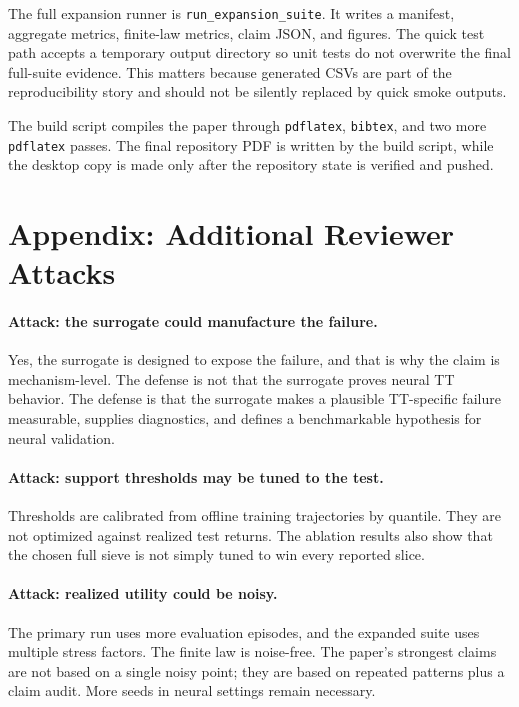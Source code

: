 \documentclass{article}
\begin{document}
The full expansion runner is \texttt{run\_expansion\_suite}. It writes a manifest, aggregate metrics, finite-law metrics, claim JSON, and figures. The quick test path accepts a temporary output directory so unit tests do not overwrite the final full-suite evidence. This matters because generated CSVs are part of the reproducibility story and should not be silently replaced by quick smoke outputs.

The build script compiles the paper through \texttt{pdflatex}, \texttt{bibtex}, and two more \texttt{pdflatex} passes. The final repository PDF is written by the build script, while the desktop copy is made only after the repository state is verified and pushed.

\section{Appendix: Additional Reviewer Attacks}

\paragraph{Attack: the surrogate could manufacture the failure.}
Yes, the surrogate is designed to expose the failure, and that is why the claim is mechanism-level. The defense is not that the surrogate proves neural TT behavior. The defense is that the surrogate makes a plausible TT-specific failure measurable, supplies diagnostics, and defines a benchmarkable hypothesis for neural validation.

\paragraph{Attack: support thresholds may be tuned to the test.}
Thresholds are calibrated from offline training trajectories by quantile. They are not optimized against realized test returns. The ablation results also show that the chosen full sieve is not simply tuned to win every reported slice.

\paragraph{Attack: realized utility could be noisy.}
The primary run uses more evaluation episodes, and the expanded suite uses multiple stress factors. The finite law is noise-free. The paper's strongest claims are not based on a single noisy point; they are based on repeated patterns plus a claim audit. More seeds in neural settings remain necessary.
\end{document}
